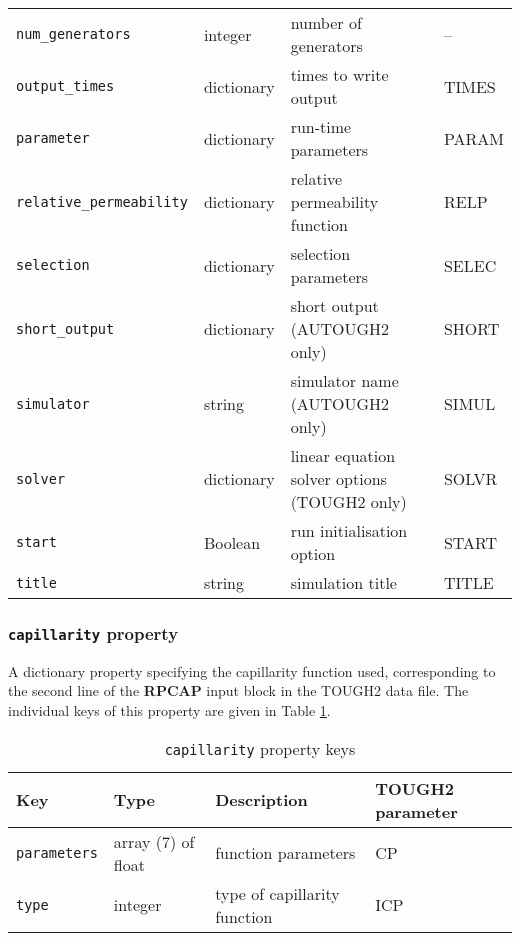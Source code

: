 \begin{sidewaystable}
\begin{center}
\begin{tabular}{|l|l|l|l|}
      \texttt{num\_generators} & integer & number of generators & --\\
      \texttt{output\_times} & dictionary & times to write output & TIMES\\
      \texttt{parameter} & dictionary & run-time parameters & PARAM\\
      \texttt{relative\_permeability} & dictionary & relative permeability function & RELP\\
      \texttt{selection} & dictionary & selection parameters & SELEC\\
      \texttt{short\_output} & dictionary & short output (AUTOUGH2 only) & SHORT\\
      \texttt{simulator} & string & simulator name (AUTOUGH2 only) & SIMUL\\
      \texttt{solver} & dictionary & linear equation solver options (TOUGH2 only) & SOLVR\\
      \texttt{start} & Boolean & run initialisation option & START\\
      \texttt{title} & string & simulation title & TITLE\\
      \hline
    \end{tabular}
    \caption{Properties of a \texttt{t2data} object}
    \label{tb:t2data_properties}
  \end{center}
\end{sidewaystable}

\subsubsection{\texttt{capillarity} property}

A dictionary property specifying the capillarity function used, corresponding to the second line of the \textbf{RPCAP} input block in the TOUGH2 data file.  The individual keys of this property are given in Table \ref{tb:capillarity}.

\begin{table}
  \begin{center}
    \begin{tabular}{|l|l|l|l|}
      \hline
      \textbf{Key} & \textbf{Type} & \textbf{Description} & \textbf{TOUGH2 parameter}\\
      \hline
      \texttt{parameters} & array (7) of float & function parameters & CP\\
      \texttt{type} & integer & type of capillarity function & ICP\\
      \hline
    \end{tabular}
    \caption{\texttt{capillarity} property keys}
    \label{tb:capillarity}
  \end{center}
\end{table}

